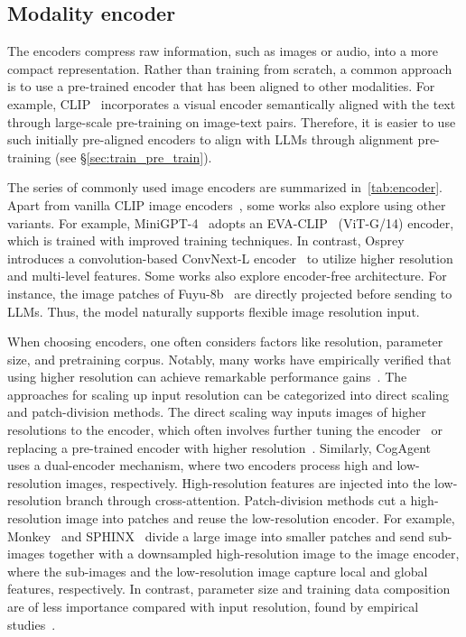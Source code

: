 \subsection{Modality encoder}
The encoders compress raw information, such as images or audio, into a more compact representation.
Rather than training from scratch, a common approach is to use a pre-trained encoder that has been aligned to other modalities. For example, CLIP~\cite{clip} incorporates a visual encoder semantically aligned with the text through large-scale pre-training on image-text pairs. Therefore, it is easier to use such initially pre-aligned encoders to align with LLMs through alignment pre-training (see \S \ref{sec:train_pre_train}). 

The series of commonly used image encoders are summarized in~\cref{tab:encoder}. Apart from vanilla CLIP image encoders~\cite{clip}, some works also explore using other variants. For example, MiniGPT-4~\cite{minigpt-4} adopts an EVA-CLIP~\cite{fang2023eva,sun2023eva} (ViT-G/14) encoder, which is trained with improved training techniques.
In contrast, Osprey~\cite{yuan2023osprey} introduces a convolution-based ConvNext-L encoder~\cite{cherti2023reproducible} to utilize higher resolution and multi-level features.  
Some works also explore encoder-free architecture. For instance, the image patches of Fuyu-8b~\cite{fuyu-8b} are directly projected before sending to LLMs. Thus, the model naturally supports flexible image resolution input.

When choosing encoders, one often considers factors like resolution, parameter size, and pretraining corpus. 
Notably, many works have empirically verified that using higher resolution can achieve remarkable performance gains~\cite{bai2023qwen,liu2023improved,li2023monkey,mckinzie2024mm1}. The approaches for scaling up input resolution can be categorized into direct scaling and patch-division methods. 
The direct scaling way inputs images of higher resolutions to the encoder, which often involves further tuning the encoder~\cite{bai2023qwen} or replacing a pre-trained encoder with higher resolution~\cite{liu2023improved}. Similarly, CogAgent~\cite{hong2023cogagent} uses a dual-encoder mechanism, where two encoders process high and low-resolution images, respectively. High-resolution features are injected into the low-resolution branch through cross-attention.
Patch-division methods cut a high-resolution image into patches and reuse the low-resolution encoder. For example, Monkey~\cite{li2023monkey} and SPHINX~\cite{lin2023sphinx} divide a large image into smaller patches and send sub-images together with a downsampled high-resolution image to the image encoder, where the sub-images and the low-resolution image capture local and global features, respectively. 
In contrast, parameter size and training data composition are of less importance compared with input resolution, found by empirical studies~\cite{mckinzie2024mm1}.

